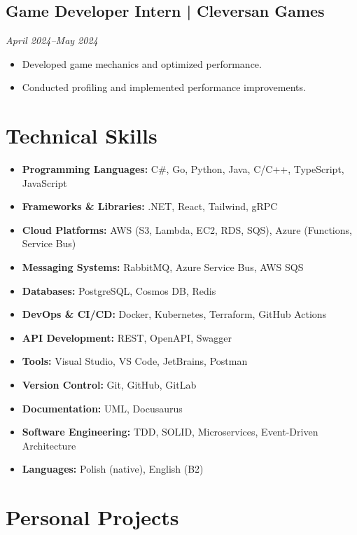 \documentclass[a4paper,10pt]{article}
\begin{document}
\subsection{Game Developer Intern | Cleversan Games}
\textit{April 2024--May 2024}
\begin{itemize}[leftmargin=0.5cm, nosep]
    \item Developed game mechanics and optimized performance.
    \item Conducted profiling and implemented performance improvements.
\end{itemize}

\section{Technical Skills}
\begin{itemize}[leftmargin=0.5cm, itemsep=6pt, label=\textbullet]
    \item \textbf{Programming Languages:} C\#, Go, Python, Java, C/C++, TypeScript, JavaScript
    \item \textbf{Frameworks \& Libraries:} .NET, React, Tailwind, gRPC
    \item \textbf{Cloud Platforms:} AWS (S3, Lambda, EC2, RDS, SQS), Azure (Functions, Service Bus)
    \item \textbf{Messaging Systems:} RabbitMQ, Azure Service Bus, AWS SQS
    \item \textbf{Databases:} PostgreSQL, Cosmos DB, Redis
    \item \textbf{DevOps \& CI/CD:} Docker, Kubernetes, Terraform, GitHub Actions
    \item \textbf{API Development:} REST, OpenAPI, Swagger
    \item \textbf{Tools:} Visual Studio, VS Code, JetBrains, Postman
    \item \textbf{Version Control:} Git, GitHub, GitLab
    \item \textbf{Documentation:} UML, Docusaurus
    \item \textbf{Software Engineering:} TDD, SOLID, Microservices, Event-Driven Architecture
    \item \textbf{Languages:} Polish (native), English (B2)
\end{itemize}

\section{Personal Projects}
\end{document}
